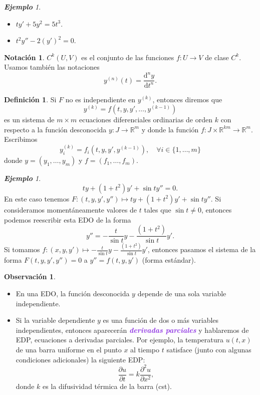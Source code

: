 \documentclass{article}
\theoremstyle{definition}
\newtheorem{definition}[theorem]{Definición}
\newtheorem*{notation}{Notación}
\newtheorem*{obs}{Observación}
\theoremstyle{remark}
\newtheorem{example}[theorem]{\textbf{Ejemplo}}
\numberwithin{equation}{section}
\newcommand{\R}{\mathbb{R}}
\renewcommand{\d}{\mathrm{d}}
\newcommand{\del}{\partial}
\newcommand{\dv}[2]{\frac{\d#1}{\d#2}}
\newcommand{\ds}{\displaystyle}
\newcommand{\wea}[1]{\textcolor{BlueViolet}{\textbf{\emph{#1}}}}
\begin{document}
\begin{example}
    \
    \begin{itemize}
        \item $ty' + 5y^2 = 5t^3$.
        \item $t^2 y'' - 2(y')^2 = 0$.
    \end{itemize}
\end{example}

\begin{notation}
$C^k(U,V)$ es el conjunto de las funciones $f \colon U \to V$ de clase $C^k$. Usamos también las notaciones
\[ y^{(n)}(t) = \dv{^n y}{t^n}. \]
\end{notation}

\begin{definition}
    Si $F$ no es independiente en $y^{(k)}$, entonces diremos que
    \[ y^{(k)} = f(t,y,y',\dots,y^{(k-1)}) \]
    es un sistema de $m \times m$ ecuaciones diferenciales ordinarias de orden $k$ con respecto a la función desconocida $y \colon J \to \R^m$ y  donde la función $f \colon J \times \R^{km} \to \R^m$. Escribimos
    \[ y_i^{(k)} = f_i(t,y,y',y^{(k-1)}), \quad \forall i \in \{1,\dots,m\} \]
    donde $y = (y_1,\dots,y_m)$ y $f = (f_1,\dots,f_m)$.
\end{definition}

\begin{example}
    \[ ty + (1+t^2) y' + \sin t y'' = 0. \]
    En este caso tenemos $F \colon (t,y,y',y'') \mapsto ty + (1+t^2) y' + \sin t y''$.
    Si consideramos momentáneamente valores de $t$ tales que $\sin t \neq 0$, entonces podemos reescribir esta EDO de la forma
    \[ y'' = - \frac{t}{\sin t} y - \frac{(1+t^2)}{\sin t} y'. \]
    Si tomamos $\ds f \colon (x,y,y') \mapsto - \frac{t}{\sin t} y - \frac{(1+t^2)}{\sin t} y'$, entonces pasamos el sistema de la forma $F(t,y,y',y'') = 0$ a $y'' = f(t,y,y')$ (forma estándar).
\end{example}

\begin{obs}
    \ \begin{itemize}
        \item En una EDO, la función desconocida $y$ depende de una sola variable independiente.
        \item Si la variable dependiente $y$ es una función de dos o más variables independientes, entonces aparecerán \wea{derivadas parciales} y hablaremos de EDP, ecuaciones a derivadas parciales. Por ejemplo, la temperatura $u(t,x)$ de una barra uniforme en el punto $x$ al tiempo $t$ satisface (junto con algunas condiciones adicionales) la siguiente EDP:
        \[ \frac{\del u}{\del t} = k \frac{\del^2 u}{\del x^2}, \]
        donde $k$ es la difusividad térmica de la barra (cst).
    \end{itemize}
\end{obs}
\end{document}
